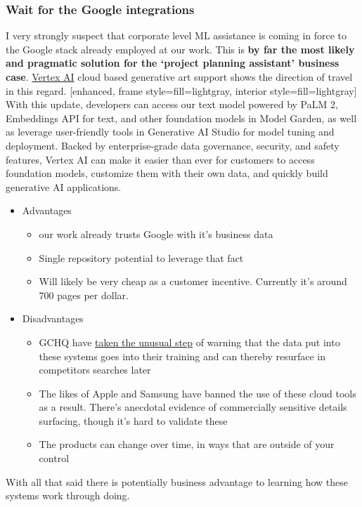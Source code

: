 \subsubsection{Wait for the Google integrations}
I very strongly suspect that corporate level ML assistance is coming in force to the Google stack already employed at our work. This is \textbf{by far the most likely and pragmatic solution for the `project planning assistant' business case}. \href{}{Vertex AI} cloud based generative art support shows the direction of travel in this regard.  [enhanced, frame style={fill=lightgray}, interior style={fill=lightgray}]
With this update, developers can access our text model powered by PaLM 2, Embeddings API for text, and other foundation models in Model Garden, as well as leverage user-friendly tools in Generative AI Studio for model tuning and deployment. Backed by enterprise-grade data governance, security, and safety features, Vertex AI can make it easier than ever for customers to access foundation models, customize them with their own data, and quickly build generative AI applications.
\begin{itemize}
\item Advantages
\begin{itemize}
\item our work already trusts Google with it's business data
\item Single repository potential to leverage that fact
\item Will likely be very cheap as a customer incentive. Currently it's around 700 pages per dollar.
\end{itemize}
\item Disadvantages
\begin{itemize}
\item GCHQ have \href{https://www.ncsc.gov.uk/blog-post/chatgpt-and-large-language-models-whats-the-risk}{taken the unusual step} of warning that the data put into these systems goes into their training and can thereby resurface in competitors searches later
\item The likes of Apple and Samsung have banned the use of these cloud tools as a result. There's anecdotal evidence of commercially sensitive details surfacing, though it's hard to validate these
\item The products can change over time, in ways that are outside of your control
\end{itemize}
\end{itemize}
With all that said there is potentially business advantage to learning how these systems work through doing.
